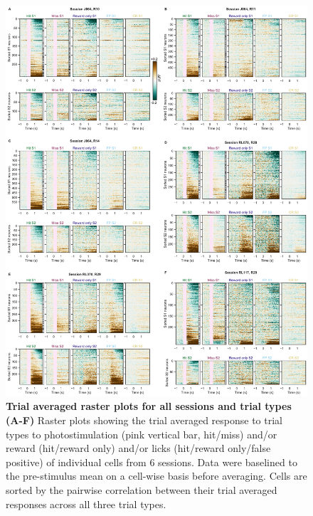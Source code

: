 \begin{figure}[h]
\hspace*{-0.6in}
\includegraphics[scale=0.45]{figures/supplements/Supplementary_Figure2.pdf}
\caption[\textbf{Trial averaged raster plots for all sessions and trial types}]{\textbf{Trial averaged raster plots for all sessions and trial types}
\textbf{(A-F)} Raster plots showing the trial averaged response to trial types to photostimulation (pink vertical bar, hit/miss) and/or reward (hit/reward only) and/or licks (hit/reward only/false positive) of individual cells from 6 sessions. Data were baselined to the pre-stimulus mean on a cell-wise basis before averaging. Cells are sorted by the pairwise correlation between their trial averaged responses across all three trial types.
} 
\label{fig:supp2}
\end{figure}

